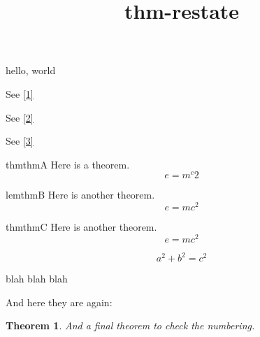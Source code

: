 \documentclass{amsart}
\title{thm-restate}
\newtheorem{thm}{Theorem}
\begin{document}
\maketitle

hello, world

\newtheorem{X}{X}

See \ref{1}

See \ref{2}

See \ref{3}

\begin{restatable}{thm}{thmA}\label{1}
Here is a theorem.
\begin{equation}
e = m^c2
\end{equation}
\end{restatable}

\begin{restatable}{lem}{thmB}\label{2}
Here is another theorem.
\begin{equation}
e = mc^2
\end{equation}
\end{restatable}

\begin{restatable}{thm}{thmC}\label{3}
Here is another theorem.
\begin{equation}
e = mc^2
\end{equation}
\end{restatable}

\begin{equation}
a^2 + b^2 = c^2
\end{equation}

blah blah blah

And here they are again:

\thmA*


\thmB*

\thmC*

\begin{thm}
And a final theorem to check the numbering.
\end{thm}

\end{document}
